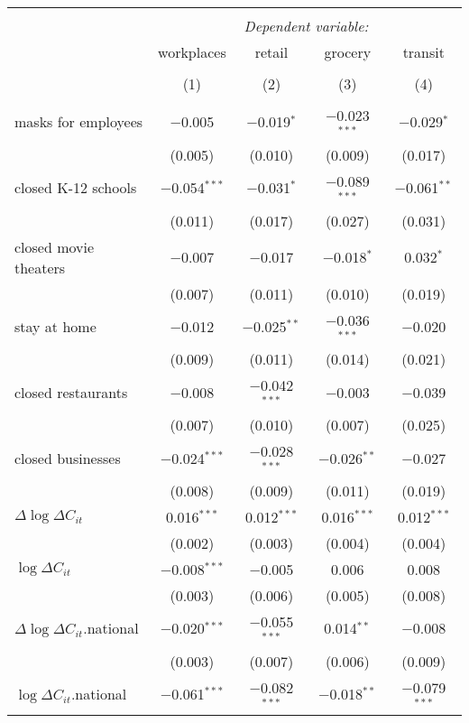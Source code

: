 \begin{tabular}{@{\extracolsep{1pt}}lcccc} 
\\[-1.8ex]\hline 
\hline \\[-1.8ex] 
 & \multicolumn{4}{c}{\textit{Dependent variable:}} \\ 
\cline{2-5} 
 & workplaces & retail & grocery & transit \\ 
\\[-1.8ex] & (1) & (2) & (3) & (4)\\ 
\hline \\[-1.8ex] 
 masks for employees & $-$0.005 & $-$0.019$^{*}$ & $-$0.023$^{***}$ & $-$0.029$^{*}$ \\ 
  & (0.005) & (0.010) & (0.009) & (0.017) \\ 
  closed K-12 schools & $-$0.054$^{***}$ & $-$0.031$^{*}$ & $-$0.089$^{***}$ & $-$0.061$^{**}$ \\ 
  & (0.011) & (0.017) & (0.027) & (0.031) \\ 
  closed movie theaters & $-$0.007 & $-$0.017 & $-$0.018$^{*}$ & 0.032$^{*}$ \\ 
  & (0.007) & (0.011) & (0.010) & (0.019) \\ 
  stay at home & $-$0.012 & $-$0.025$^{**}$ & $-$0.036$^{***}$ & $-$0.020 \\ 
  & (0.009) & (0.011) & (0.014) & (0.021) \\ 
  closed restaurants & $-$0.008 & $-$0.042$^{***}$ & $-$0.003 & $-$0.039 \\ 
  & (0.007) & (0.010) & (0.007) & (0.025) \\ 
  closed businesses & $-$0.024$^{***}$ & $-$0.028$^{***}$ & $-$0.026$^{**}$ & $-$0.027 \\ 
  & (0.008) & (0.009) & (0.011) & (0.019) \\ 
  $\Delta \log \Delta C_{it}$ & 0.016$^{***}$ & 0.012$^{***}$ & 0.016$^{***}$ & 0.012$^{***}$ \\ 
  & (0.002) & (0.003) & (0.004) & (0.004) \\ 
  $\log \Delta C_{it}$ & $-$0.008$^{***}$ & $-$0.005 & 0.006 & 0.008 \\ 
  & (0.003) & (0.006) & (0.005) & (0.008) \\ 
  $\Delta \log \Delta C_{it}$.national & $-$0.020$^{***}$ & $-$0.055$^{***}$ & 0.014$^{**}$ & $-$0.008 \\ 
  & (0.003) & (0.007) & (0.006) & (0.009) \\ 
  $\log \Delta C_{it}$.national & $-$0.061$^{***}$ & $-$0.082$^{***}$ & $-$0.018$^{**}$ & $-$0.079$^{***}$ \\ 

\end{tabular}
